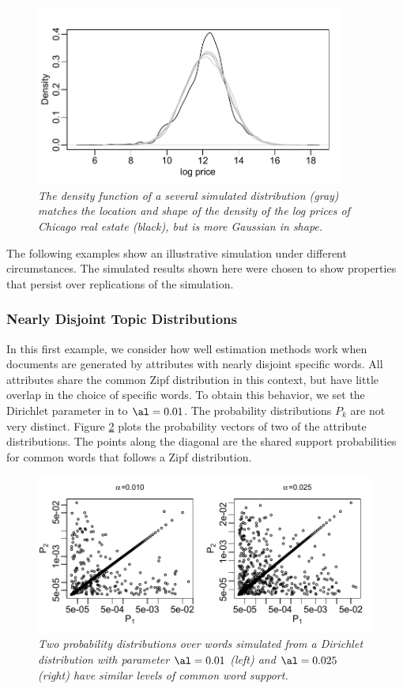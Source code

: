\documentclass[12pt]{article}
\begin{document}
\begin{figure}
\caption{  \label{fig:density}  
  {\sl The density function of a several simulated distribution (gray) matches the location and shape of the density of the log prices of Chicago real estate (black), but is more Gaussian in shape.}  }
  \centerline{ \includegraphics[width=4in]{figures/density.pdf} }
\end{figure}
 
 
 The following examples show an illustrative simulation under different circumstances.  The simulated results shown here were chosen to show properties that persist over replications of the simulation. 
 
 
 \subsubsection{Nearly Disjoint Topic Distributions} %
  
In this first example, we consider how well estimation methods work when documents are generated by attributes with nearly disjoint specific words.  All attributes share the common Zipf distribution in this context, but have little overlap in the choice of specific words.  To obtain this behavior, we set the Dirichlet parameter in  to $\al = 0.01$.   The probability distributions $P_k$ are not very distinct.  Figure \ref{fig:P} plots the probability vectors of two of the attribute distributions.  The points along the diagonal are the shared support probabilities for common words that follows a Zipf distribution.


\begin{figure}
\caption{ \label{fig:P}
{ \sl  Two probability distributions over words simulated from a Dirichlet distribution with parameter $\al = 0.01$ (left) and $\al = 0.025$ (right) have similar levels of common word support.}}
 \centerline{
 \vspace{0.1in}
 \includegraphics[width=7.5in]{figures/P} }
 \end{figure}
\end{document}
